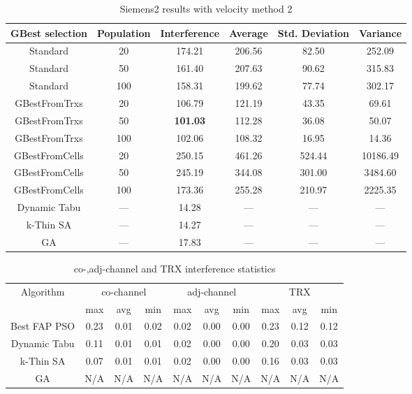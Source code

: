 \begin{table}[H]
\centering
	\begin{tabular}{cccccc}
	\toprule
    GBest selection & Population & Interference & Average & Std. Deviation & Variance \\
    \midrule
    Standard & 20 & 174.21 & 206.56 &  82.50 & 252.09\\
    Standard & 50 & 161.40 & 207.63 &  90.62 & 315.83\\
    Standard & 100 & 158.31 & 199.62 &  77.74 & 302.17\\
    GBestFromTrxs & 20 & 106.79 & 121.19 &  43.35 &  69.61\\
    GBestFromTrxs & 50 & \textbf{101.03} & 112.28 &  36.08 &  50.07\\
    GBestFromTrxs & 100 & 102.06 & 108.32 &  16.95 &  14.36\\
    GBestFromCells & 20 & 250.15 & 461.26 & 524.44 & 10186.49\\
    GBestFromCells & 50 & 245.19 & 344.08 & 301.00 & 3484.60\\
    GBestFromCells & 100 & 173.36 & 255.28 & 210.97 & 2225.35\\
    \midrule
    Dynamic Tabu & --- & 14.28 & --- & --- & --- \\
    k-Thin SA & --- & 14.27 & --- & --- & --- \\
    GA & --- & 17.83 & --- & --- & --- \\
    \bottomrule
	\end{tabular}
\caption{Siemens2 results with velocity method 2}
\label{tab:siem2m2}
\end{table}
\begin{table}[H]
\centering
	\begin{tabular}{cccccccccc}
	\toprule
    Algorithm & \multicolumn{3}{c}{co-channel} & \multicolumn{3}{c}{adj-channel} & \multicolumn{3}{c}{TRX}\\
              & max & avg & min
              & max & avg & min
              & max & avg & min\\
    \midrule
    Best FAP PSO & 0.23 & 0.01 & 0.02 & 0.02 & 0.00 & 0.00 & 0.23 & 0.12 & 0.12 \\
    Dynamic Tabu & 0.11 & 0.01 & 0.01 & 0.02 & 0.00 & 0.00 & 0.20 & 0.03 & 0.03\\
    k-Thin SA & 0.07 & 0.01 & 0.01 & 0.02 & 0.00 & 0.00 & 0.16 & 0.03 & 0.03\\
    GA & \scriptsize{N/A} & \scriptsize{N/A} & \scriptsize{N/A} & \scriptsize{N/A} & \scriptsize{N/A} & \scriptsize{N/A} & \scriptsize{N/A} & \scriptsize{N/A} & \scriptsize{N/A}\\
    \bottomrule
	\end{tabular}
\caption{co-,adj-channel and TRX interference statistics}
\label{tab:stats-siem2m1}
\end{table}
